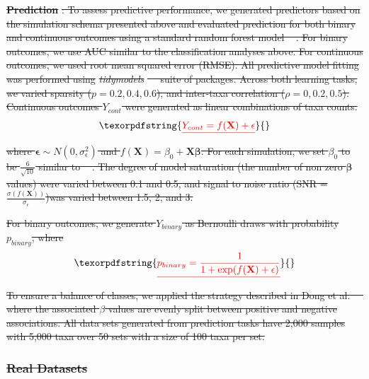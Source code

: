 \documentclass[10pt,letterpaper]{article}
\providecommand{\DIFdeltex}[1]{{\protect\color{red}\sout{#1}}}                      %
\providecommand{\DIFdelbegin}{} %
\providecommand{\DIFdel}[1]{\texorpdfstring{\DIFdeltex{#1}}{}} %
\newcommand{\DIFscaledelfig}{0.5}
\newlength{\DIFdelgraphicswidth} %
\newlength{\DIFdelgraphicsheight} %
\newcommand{\DIFdelincludegraphics}[2][]{%
\sbox{\DIFdelgraphicsbox}{\DIFOincludegraphics[#1]{#2}}%
\settoboxwidth{\DIFdelgraphicswidth}{\DIFdelgraphicsbox} %
\settoboxtotalheight{\DIFdelgraphicsheight}{\DIFdelgraphicsbox} %
\scalebox{\DIFscaledelfig}{%
\parbox[b]{\DIFdelgraphicswidth}{\usebox{\DIFdelgraphicsbox}\\[-\baselineskip] \rule{\DIFdelgraphicswidth}{0em}}\llap{\resizebox{\DIFdelgraphicswidth}{\DIFdelgraphicsheight}{%
\setlength{\unitlength}{\DIFdelgraphicswidth}%
\begin{picture}(1,1)%
\thicklines\linethickness{2pt} %
{\color[rgb]{1,0,0}\put(0,0){\framebox(1,1){}}}%
{\color[rgb]{1,0,0}\put(0,0){\line( 1,1){1}}}%
{\color[rgb]{1,0,0}\put(0,1){\line(1,-1){1}}}%
\end{picture}%
}\hspace*{3pt}}} %
} %
\DeclareRobustCommand{\DIFdelbegin}{\DIFOdelbegin \let\includegraphics\DIFdelincludegraphics} %
\begin{document}
\DIFdelbegin %
\textbf{\DIFdel{Prediction}}%
\DIFdel{: To assess predictive performance, we generated predictors based on the simulation schema presented above and evaluated prediction for both binary and continuous outcomes using a standard random forest model \mbox{%
\cite{breiman2001}}\hspace{0pt}%
. For binary outcomes, we use AUC similar to the classification analyses above. For continuous outcomes, we used root mean squared error (RMSE). All predictive model fitting was performed using }\emph{\DIFdel{tidymodels}} %
\DIFdel{\mbox{%
\cite{kuhn2020} }\hspace{0pt}%
suite of packages.  Across both learning tasks, we varied sparsity ($p = 0.2, 0.4, 0.6$), and inter-taxa correlation ($\rho = 0, 0.2, 0.5$).  
Continuous outcomes $Y_{cont}$ were generated as linear combinations of taxa counts. }\begin{displaymath}
    \DIFdel{Y_{cont} = f(\mathbf{X}) + \mathbf{\epsilon}
}\end{displaymath}%
\DIFdel{where $\mathbf{\epsilon} \sim N(0, \sigma_{\epsilon}^2)$ and $f(\mathbf{X}) = \beta_0 + \mathbf{X}\mathbf{\beta}$. For each simulation, we set $\beta_0$ to be $\frac{6}{\sqrt{10}}$ similar to \mbox{%
\cite{xiao2018}}\hspace{0pt}%
. The degree of model saturation (the number of non zero $\mathbf{\beta}$ values) were varied between 0.1 and 0.5, and signal to noise ratio (SNR = $\frac{\sigma(f(\mathbf{X}))}{\sigma_{\epsilon}}$)was varied between 1.5, 2, and 3. 
}%

\DIFdel{For binary outcomes, we generate $Y_{binary}$ as Bernoulli draws with probability $p_{binary}$, where 
}\begin{displaymath}
    \DIFdel{p_{binary} = \frac{1}{1 + \exp(f(\mathbf{X}) + \mathbf{\epsilon})}
}\end{displaymath}%
\DIFdel{To ensure a balance of classes, we applied the strategy described in Dong et al. \mbox{%
\cite{dong2020} }\hspace{0pt}%
where the associated $\beta$ values are evenly split between positive and negative associations. All data sets generated from prediction tasks have 2,000 samples with 5,000 taxa over 50 sets with a size of 100 taxa per set. }%

\subsubsection*{\DIFdel{Real Datasets}}
\end{document}
